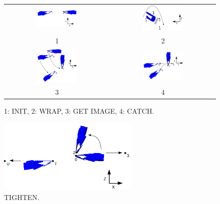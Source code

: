         \begin{figure}
            \centering
            \begin{tabular}{c|c}
            \includegraphics[width=0.4\textwidth]{01Init.png}
            &
            \includegraphics[width=0.4\textwidth]{02Wrap.png} \\
            1 & 2 \\
            \hline
            \includegraphics[width=0.4\textwidth]{03GetImage.png}
            &
            \includegraphics[width=0.4\textwidth]{04Catch.png} \\
            3 & 4 \\
            
            \end{tabular}
            \caption{1: INIT, 2: WRAP, 3: GET IMAGE, 4: CATCH.}
            \label{fig:TyerStates}
        \end{figure}


        \begin{figure}
        \includegraphics[width=0.6\textwidth]{05Tighten.png}
        \centering
        \caption{TIGHTEN.}
        \label{fig:TyerTighten}
        \end{figure}



